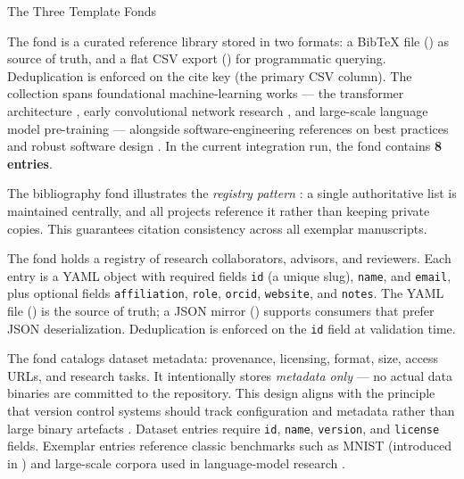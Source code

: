 \documentclass[
  ignorenonframetext,
]{beamer}
\begin{document}
\begin{frame}{The Three Template Fonds}
\protect{}\label{the-three-template-fonds}
\begin{block}{}
\protect{}\label{template_bibliography}
The  fond is a curated reference library
stored in two formats: a BibTeX file () as
source of truth, and a flat CSV export ()
for programmatic querying. Deduplication is enforced on the cite key
(the primary CSV column). The collection spans foundational
machine-learning works --- the transformer architecture
, early convolutional network research
, and large-scale language model pre-training
 --- alongside software-engineering references on
best practices  and robust software design
. In the current integration run, the fond contains
\textbf{8 entries}.

The bibliography fond illustrates the \emph{registry pattern}
: a single authoritative list is maintained
centrally, and all projects reference it rather than keeping private
copies. This guarantees citation consistency across all exemplar
manuscripts.
\end{block}

\begin{block}{}
\protect{}\label{template_contacts}
The  fond holds a registry of research
collaborators, advisors, and reviewers. Each entry is a YAML object with
required fields \texttt{id} (a unique slug), \texttt{name}, and
\texttt{email}, plus optional fields \texttt{affiliation},
\texttt{role}, \texttt{orcid}, \texttt{website}, and \texttt{notes}. The
YAML file () is the source of truth; a JSON
mirror () supports consumers that prefer JSON
deserialization. Deduplication is enforced on the \texttt{id} field at
validation time.
\end{block}

\begin{block}{}
\protect{}\label{template_datasets}
The  fond catalogs dataset metadata:
provenance, licensing, format, size, access URLs, and research tasks. It
intentionally stores \emph{metadata only} --- no actual data binaries
are committed to the repository. This design aligns with the principle
that version control systems should track configuration and metadata
rather than large binary artefacts . Dataset
entries require \texttt{id}, \texttt{name}, \texttt{version}, and
\texttt{license} fields. Exemplar entries reference classic benchmarks
such as MNIST (introduced in ) and large-scale
corpora used in language-model research .
\end{block}
\end{frame}
\end{document}
